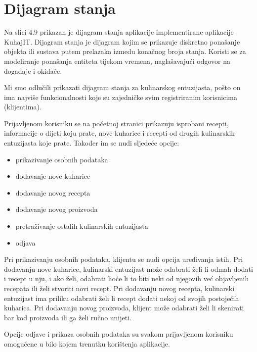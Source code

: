 		\eject
		
		
		\section{Dijagram stanja}
		
		Na slici 4.9 prikazan je dijagram stanja aplikacije implementirane aplikacije KuhajIT. Dijagram stanja je dijagram kojim se prikazuje diskretno ponašanje objekta ili sustava putem prelazaka izmedu konačnog broja stanja. Koristi se za modeliranje ponašanja entiteta tijekom vremena, naglašavajući odgovor na događaje i okidače.
		
		Mi smo odlučili prikazati dijagram stanja za kulinarskog entuzijasta, pošto on ima najviše funkcionalnosti koje su zajedničke svim registriranim korisnicima (klijentima).
		
  Prijavljenom korisniku se na početnoj stranici prikazuju isprobani recepti, informacije o dijeti koju prate, nove kuharice i recepti od drugih kulinarskih entuzijasta koje prate. Također im se nudi sljedeće opcije:
  \begin{itemize}
			\item prikazivanje osobnih podataka
			\item dodavanje nove kuharice
			\item dodavanje novog recepta 
			\item dodavanje novog proizvoda
			\item pretraživanje ostalih kulinarskih entuzijasta
			\item odjava
		\end{itemize}
		
Pri prikazivanju osobnih podataka, klijentu se nudi opcija uređivanja istih. 
Pri dodavanju nove kuharice, kulinarski entuzijast može odabrati želi li odmah dodati i recept u nju, i ako želi, odabrati hoće li to biti neki od njegovih već objavljenih recepata ili želi stvoriti novi recept.
Pri dodavanju novog recepta, kulinarski entuzijast ima priliku odabrati želi li recept dodati nekoj od svojih postojećih kuharica.
Pri dodavanju novog proizvoda, klijent može odabrati želi li skenirati bar kod proizvoda ili ga želi ručno unijeti.

Opcije odjave i prikaza osobnih podataka su svakom prijavljenom korisniku omogućene u bilo kojem trenutku korištenja aplikacije.

